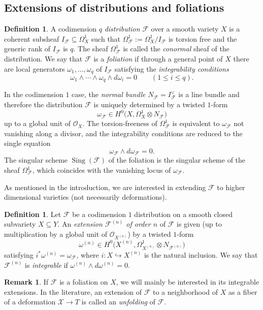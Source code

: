 \documentclass[reqno]{amsart}
\theoremstyle{plain}
\newcommand{\OO}{\mathcal{O}}
\newcommand{\X}{\mathcal{X}}
\newcommand{\F}{\mathscr{F}}
\DeclareMathOperator{\Sing}{Sing}
\theoremstyle{definition}
\newtheorem{definition}[theorem]{Definition}
\newtheorem{remark}[theorem]{Remark}
\theoremstyle{named}
\begin{document}
\subsection{Extensions of distributions and foliations}

\begin{definition}
A codimension $q$ \textit{distribution} $\F$ over a smooth variety $X$ is a coherent subsheaf $I_\F\subseteq \Omega^1_X$
such that $\Omega^1_\F:=\Omega^1_X/I_\F$ is torsion free and the generic rank of $I_\F$ is $q$. The sheaf $\Omega^1_\F$ is called the \textit{conormal} sheaf of the distribution. We say that $\F$ is a \textit{foliation} if through a general point of $X$ there are local generators $\omega_1,\dots,\omega_q$ of $I_\F$ satisfying the \textit{integrability conditions}
\[
\omega_1\wedge\cdots\wedge \omega_q \wedge d\omega_i = 0 \quad\quad (1\leqslant i \leqslant q).
\]
\end{definition}
In the codimension $1$ case, the \textit{normal bundle} $N_\F = I_\F^\vee$ is a line bundle and therefore the distribution $\F$ is uniquely determined by a twisted $1$-form 
$$\omega_\F\in H^0\big(X,\Omega^1_X\otimes N_\F\big)$$ 
up to a global unit of $\OO_X$. The torsion-freeness of $\Omega^1_\F$ is equivalent to $\omega_\F$ not vanishing along a divisor, and the integrability conditions are reduced to the single equation
\[
\omega_\F\wedge d\omega_\F = 0.
\]
The singular scheme $\Sing(\F)$ of the foliation is the singular scheme of the sheaf $\Omega^1_\F$, which coincides with the vanishing locus of $\omega_\F$.

As mentioned in the introduction, we are interested in extending $\F$ to higher dimensional varieties (not necessarily deformations).

\begin{definition}
Let $\F$ be a codimension $1$ distribution on a smooth closed subvariety $X\subseteq Y$. An \textit{extension $\F^{(n)}$ of order $n$} of $\F$ is given (up to multiplication by a global unit of $\OO_{X^{(n)}}$) by a twisted $1$-form
\[
\omega^{(n)}\in H^0\Big(X^{(n)},\Omega^1_{X^{(n)}}\otimes N_{\F^{(n)}}\Big)
\]
satisfying $i^*\omega^{(n)}=\omega_\F$, where $i:X\hookrightarrow X^{(n)}$ is the natural inclusion. We say that  $\F^{(n)}$ is \textit{integrable} if
$\omega^{(n)}\wedge d\omega^{(n)} = 0.$
\end{definition}  

\begin{remark} \label{def_unf}
If $\F$ is a foliation on $X$, we will mainly be interested in its integrable extensions. In the literature, an extension of $\F$ to a neighborhood of $X$ as a fiber of a deformation $\X\rightarrow T$ is called an \textit{unfolding} of $\F$. 
\end{remark}
\end{document}
